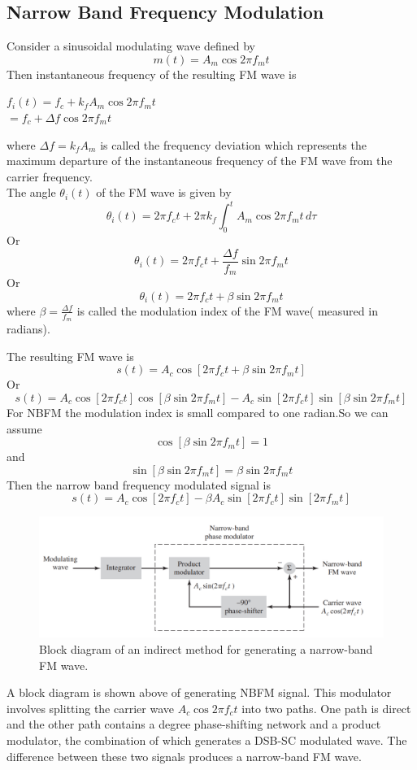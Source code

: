 \documentclass[12pt,a4paper]{article}%
\begin{document}
\begin{flushleft}
	\subsection{Narrow Band Frequency Modulation}
	Consider a sinusoidal modulating wave defined by
	$$m(t)= A_m \cos{2\pi f_m t}$$
	Then instantaneous frequency of the resulting FM wave is
	\begin{center} \label{eq:erl}
	$f_i(t)=f_c+k_f A_m \cos{2\pi f_m t}$\\
	$=f_c+\Delta f \cos{2\pi f_m t}$
	\end{center}
	where $\Delta f= k_f A_m $ is called the frequency deviation which represents the maximum departure of the instantaneous frequency of the FM wave from the carrier frequency.\\
	The angle $\theta_i(t)$ of the FM wave is given by
	$$\theta_i(t)=2\pi f_ct+2\pi k_f \int_0^tA_m \cos{2\pi f_m t} \,d\tau$$
	Or             $$\theta_i(t)=2\pi f_ct+\frac{\Delta f}{f_m} \sin{2 \pi f_m t}$$
	Or             $$\theta_i(t)=2\pi f_ct+\beta \sin{2 \pi f_m t}$$
	where $\displaystyle{\beta=\frac{\Delta f}{f_m}}$ is called
	the modulation index of the FM wave( measured in radians).
	
	The resulting FM wave is 
	\begin{equation}
	s(t)=A_c \cos{[2\pi f_ct+\beta \sin{2 \pi f_m t}]}
	\end{equation}
	Or
	$$s(t)=A_c \cos{[2\pi f_ct]}\cos{[\beta \sin{2 \pi f_m t}]}-A_c \sin{[2\pi f_ct]}\sin{[\beta \sin{2 \pi f_m t}]}  $$
	For NBFM the modulation index is small compared to one radian.So we can assume 
	$$\cos{[\beta \sin{2 \pi f_m t}]}=1$$
	and $$\sin{[\beta \sin{2 \pi f_m t}]}=\beta \sin{2 \pi f_m t}$$
	Then the narrow band frequency modulated signal is 
	\begin{equation}
	s(t)= A_c \cos{[2\pi f_ct]}- \beta A_c\sin{[2 \pi f_c t]} \sin{[2 \pi f_m t]}
	\end{equation}
	\begin{figure}
		\includegraphics[scale=0.4]{./images/BD1.png}
		\caption{Block diagram of an indirect method for generating a narrow-band FM wave.}
		\label{BD1}
	\end{figure}
	A block diagram is shown above of generating NBFM signal. This modulator involves splitting the carrier wave $A_c\cos{2\pi f_c t}$ into two paths. One path is direct and the other path contains a degree phase-shifting network and a product modulator, the combination of which generates a DSB-SC modulated wave. The difference between these two signals produces a narrow-band FM wave.
	

\end{flushleft}
\end{document}
